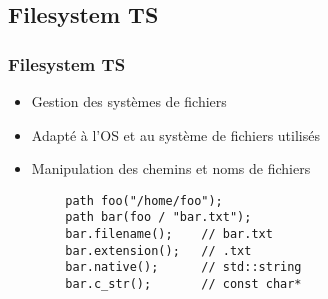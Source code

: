 \documentclass[C++.tex]{subfiles}
\begin{document}
\subsection*{Filesystem TS}
\begin{frame}[fragile]
	\frametitle{Filesystem TS}
	\begin{itemize}
		\item Gestion des systèmes de fichiers
		\item Adapté à l'OS et au système de fichiers utilisés
		\item Manipulation des chemins et noms de fichiers
	\end{itemize}

	\begin{verbatim}
		path foo("/home/foo");
		path bar(foo / "bar.txt");
		bar.filename();    // bar.txt
		bar.extension();   // .txt
		bar.native();      // std::string
		bar.c_str();       // const char*
	\end{verbatim}


\end{frame}
\end{document}
